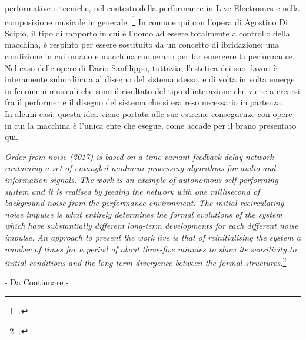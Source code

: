 performative e tecniche, nel contesto della performance in Live Electronics e nella composizione musicale in generale. 
\footcite{sanfilippo_time-variant_2018}
In comune qui con l'opera di Agostino Di Scipio, il tipo di rapporto in cui è l'uomo ad essere totalmente a controllo della macchina,
è respinto per essere sostituito da un concetto di ibridazione: 
una condizione in cui umano e macchina cooperano per far emergere la performance. 
Nel caso delle opere di Dario Sanfilippo, tuttavia, l'estetica dei suoi lavori è interamente subordinata
al disegno del sistema stesso, e di volta in volta emerge in fenomeni musicali che sono il risultato
del tipo d'interazione che viene a crearsi fra il performer e il disegno del sistema che si era reso necessario
in partenza. \\
In alcuni casi, questa idea viene portata alle sue estreme conseguenze con opere in cui la macchina è l'unica 
ente che esegue, come accade per il brano presentato qui.

\begin{center}
    \vspace{0.5cm}
    \textit{Order from noise (2017) is based on a time-variant feedback delay network containing a 
    set of entangled nonlinear processing algorithms for audio and information signals. 
    The work is an example of autonomous self-performing system and it is realised by
    feeding the network with one millisecond of background noise from the performance
    environment. The initial recirculating noise impulse is what entirely determines the
    formal evolutions of the system which have substantially different long-term developments 
    for each different noise impulse. An approach to present the work live is that
    of reinitialising the system a number of times for a period of about three-five minutes
    to show its sensitivity to initial conditions and the long-term divergence between the
    formal structures.}\footcite{sanfilippo_time-variant_2018}
    \vspace{0.5cm}
\end{center}

\begin{center} \vspace{0.5cm} \Huge - Da Continuare - \normalsize \vspace{0.5cm} \end{center}

